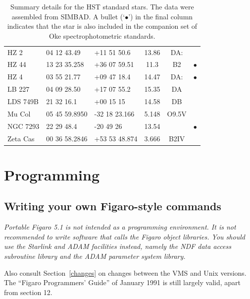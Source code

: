 \documentclass[11pt,twoside]{article}
\newcommand{\stardocinitials}  {SUN}
\newcommand{\stardocnumber}    { 86.21}
\newcommand{\stardocname}{\stardocinitials /\stardocnumber}
\newcommand{\htmlref}[2]{#1}
\newcommand{\xlabel}[1]{}
\newcommand{\latorhtm}[2]{#1}
\newcommand{\latorhtm}[2]{#2}
\begin{document}
\begin{table}[htbp]
\begin{center}
\begin{tabular}{lllccc}
HZ 2        & 04 12 43.49   & +11 51 50.6   &  13.86  & DA:    &   \\
HZ 44       & 13 23 35.258  & +36 07 59.51  &  11.3   & B2     & $\bullet$ \\
HZ 4        & 03 55 21.77   & +09 47 18.4   &  14.47  & DA:    & $\bullet$ \\
LB 227      & 04 09 28.50   & +17 07 55.2   &  15.35  & DA     &   \\
LDS 749B    & 21 32 16.1    & +00 15 15     &  14.58  & DB     &   \\
Mu Col      & 05 45 59.8950 & -32 18 23.166 &   5.148 & O9.5V  &   \\
NGC 7293    & 22 29 48.4    & -20 49 26     &  13.54  &        & $\bullet$ \\
Zeta Cas    & 00 36 58.2846 & +53 53 48.874 &   3.666 & B2IV   &   \\
\end{tabular}
\end{center}

\begin{quote}
\caption{Summary details for the HST standard stars.  The data were
assembled from SIMBAD.  A bullet (`$\bullet$') in the final column
indicates that the star is also included in the companion set of Oke
spectrophotometric standards.
\label{HSTSTAND} }
\end{quote}

\end{table}



\newpage %
\section{\xlabel{programming}Programming}
\markboth{Programming}{\stardocname}


\subsection{\label{proghint}Writing your own Figaro-style commands}

{\em
   Portable Figaro 5.1 is not intended as a programming environment. It
   is not recommended to write software that calls the Figaro object
   libraries. You should use the Starlink and ADAM facilities instead,
   namely the NDF data access subroutine library and the ADAM parameter
   system library.

   Also consult
   \latorhtm{Section~\ref{changes} on changes}
   {the section on \htmlref{changes}{changes}}
   between the VMS and Unix
   versions. The ``Figaro Programmers' Guide'' of January 1991 is still
   largely valid, apart from section 12.
\/}
\end{document}
